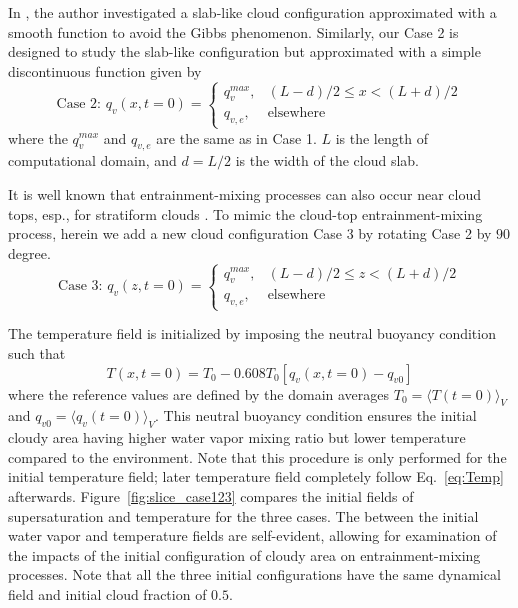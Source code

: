 \documentclass[draft,linenumbers]{agujournal}
\newcommand{\Eq}[1]{Eq.~\eqref{#1}} \newcommand{\Fig}[1]{Figure~\ref{#1}}
\begin{document}
In \citet{Kumar11}, the author investigated a slab-like cloud configuration approximated with a smooth function to avoid the Gibbs phenomenon. Similarly, our Case 2 is designed to study the slab-like configuration but approximated with a simple discontinuous function given by
\begin{equation}
\mbox{Case 2: } q_v(x,t=0) = 
\left\{\begin{array}{lr}
q_v^{max}, & (L-d)/2 \le x < (L+d)/2\\
q_{v,e}, & \mbox{elsewhere}
\end{array}\right.\label{case2}
\end{equation}
where the $q_v^{max}$ and $q_{v,e}$ are the same as in Case 1.
$L$ is the length of computational domain, and $d = L/2$ is the width of the cloud slab.

It is well known that entrainment-mixing processes can also occur near cloud tops, esp., for stratiform clouds \citep{Lu2011, Yum2015}. To mimic the cloud-top entrainment-mixing process, herein we add a new cloud configuration Case 3 by rotating Case 2 by $90$ degree.
\begin{equation}
\mbox{Case 3: } q_v(z,t=0) = 
\left\{\begin{array}{lr}
q_v^{max}, & (L-d)/2 \le z < (L+d)/2\\
q_{v,e}, & \mbox{elsewhere}
\end{array}\right.\label{case3}
\end{equation}

The temperature field is initialized by imposing the neutral buoyancy condition such that \citep{Kumar14}
\begin{equation}
T(x,t = 0) = T_0 - 0.608T_0[q_v(x,t = 0) - q_{v0}]
\end{equation}
where the reference values are defined by the domain averages $T_0 = \langle T(t=0)\rangle_V$ and $q_{v0} = \langle q_v(t=0)\rangle_V$. This neutral buoyancy condition ensures the initial cloudy area having higher water vapor mixing ratio but lower temperature compared to the environment. Note that this procedure is only performed for the initial temperature field; later temperature field completely follow \Eq{eq:Temp} afterwards. \Fig{fig:slice_case123} compares the initial fields of  supersaturation and temperature for the three cases. The  between the initial water vapor 
and temperature fields are self-evident, allowing for examination of the impacts of the initial 
configuration of cloudy area on entrainment-mixing processes. Note that all the three initial 
configurations have the same dynamical field and initial cloud fraction of $0.5$.
\end{document}
